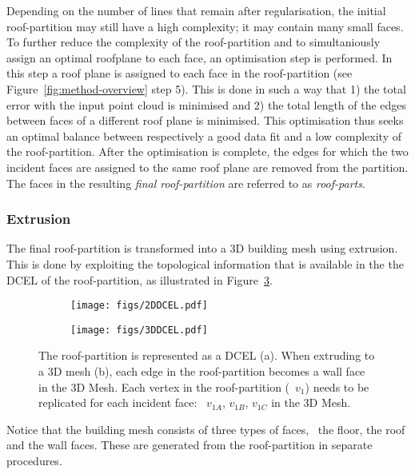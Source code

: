 Depending on the number of lines that remain after regularisation, the initial roof-partition may still have a high complexity; it may contain many small faces.
To further reduce the complexity of the roof-partition and to simultaniously assign an optimal roofplane to each face, an optimisation step is performed.
In this step a roof plane is assigned to each face in the roof-partition (see Figure~\ref{fig:method-overview} step 5).
This is done in such a way that 1) the total error with the input point cloud is minimised and 2) the total length of the edges between faces of a different roof plane is minimised.
This  optimisation thus seeks an optimal balance between respectively a good data fit and a low complexity of the roof-partition.
After the optimisation is complete, the edges for which the two incident faces are assigned to the same roof plane are removed from the partition.
The faces in the resulting \emph{final roof-partition} are referred to as \emph{roof-parts}.

\subsubsection{Extrusion}%
\label{sec:extrusion}
The final roof-partition is transformed into a 3D building mesh using extrusion.
This is done by exploiting the topological information that is available in the the DCEL of the roof-partition, as illustrated in Figure~\ref{fig:extrusion}.
\begin{figure}
	\centering
	\begin{subfigure}[b]{0.45\linewidth}
		\texttt{[image: figs/2DDCEL.pdf]}
		\caption{}%
		\label{subfig:2ddcel}
	\end{subfigure}
	\quad
	\begin{subfigure}[b]{0.45\linewidth}
		\texttt{[image: figs/3DDCEL.pdf]}
		\caption{}%
		\label{subfig:3ddcel}
	\end{subfigure}
	\caption[The roof-partition represented as a DCEL]{The roof-partition is represented as a DCEL (a). When extruding to a 3D mesh (b), each edge in the roof-partition becomes a wall face in the 3D Mesh. Each vertex in the roof-partition (\eg\ $v_1$) needs to be replicated for each incident face: \eg\ $v_{1A}$, $v_{1B}$, $v_{1C}$ in the 3D Mesh.}%
	\label{fig:extrusion}
\end{figure}
Notice that the building mesh consists of three types of faces, \ie\ the floor, the roof and the wall faces.
These are generated from the roof-partition in separate procedures.

